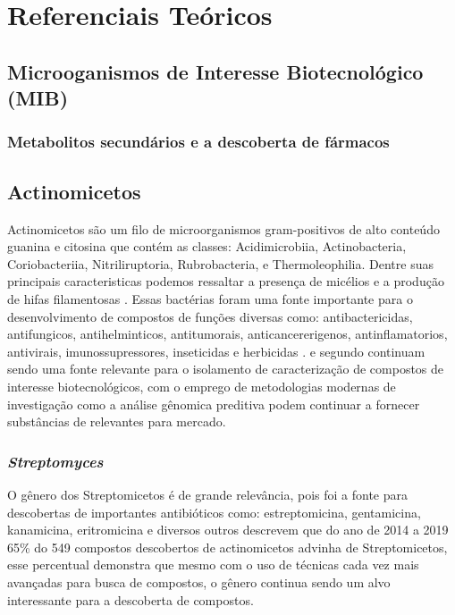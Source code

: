 \chapter{Referenciais Teóricos}
\label{cap:referenciais_teoricos}

\section{Microoganismos de Interesse Biotecnológico (MIB)}

\subsection{Metabolitos secundários e a descoberta de fármacos}

\section{Actinomicetos}
Actinomicetos são um filo de microorganismos gram-positivos de alto conteúdo
guanina e citosina que contém as classes: Acidimicrobiia, Actinobacteria, 
Coriobacteriia, Nitriliruptoria, Rubrobacteria, e Thermoleophilia\cite{yadav2018}.
Dentre suas principais caracteristicas podemos ressaltar a presença de micélios
e a produção de hifas filamentosas \cite{chater2016}.
Essas bactérias foram uma fonte importante para o desenvolvimento de compostos de funções
diversas como: antibactericidas, antifungicos, antihelminticos, antitumorais, anticancererigenos,
antinflamatorios, antivirais, imunossupressores, inseticidas e herbicidas \cite{demain2009,jose2021}.
e segundo  continuam sendo uma fonte relevante
para o isolamento de caracterização de compostos de interesse biotecnológicos, com o
emprego de metodologias modernas de investigação como a análise gênomica preditiva
podem continuar a fornecer substâncias de relevantes para mercado.

\subsection{\textit{Streptomyces}}
O gênero dos Streptomicetos é de grande relevância, pois foi a fonte para descobertas de importantes antibióticos 
como: estreptomicina, gentamicina, kanamicina, eritromicina e diversos outros \cite{demain2009}
 descrevem que do ano de 2014 a 2019 65\% do 549 compostos descobertos
de actinomicetos advinha de Streptomicetos, esse percentual demonstra que mesmo com o uso de técnicas
cada vez mais avançadas para busca de compostos, o gênero continua sendo um alvo interessante
para a descoberta de compostos. 



